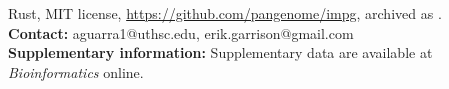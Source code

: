Rust, MIT license, \url{https://github.com/pangenome/impg}, archived as .
\\
\textbf{Contact:} aguarra1@uthsc.edu, erik.garrison@gmail.com
\\
\textbf{Supplementary information:} Supplementary data are available at \textit{Bioinformatics} online.

